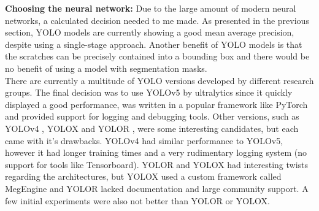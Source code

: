 \textbf{Choosing the neural network:}
Due to the large amount of modern neural networks, a calculated decision needed to me made. As presented in the previous section, YOLO models are currently showing a good mean average precision, despite using a single-stage approach. Another benefit of YOLO models is that the scratches can be precisely contained into a bounding box and there would be no benefit of using a model with segmentation masks. \\
There are currently a multitude of YOLO versions developed by different research groups. The final decision was to use YOLOv5 by ultralytics \cite{yolov5_git} since it quickly displayed a good performance, was written in a popular framework like PyTorch and provided support for logging and debugging tools. Other versions, such as YOLOv4 \cite{yolov4_paper}, YOLOX \cite{yolox_paper} and YOLOR \cite{yolor_paper}, were some interesting candidates, but each came with it's drawbacks. YOLOv4 had similar performance to YOLOv5, however it had longer training times and a very rudimentary logging system (no support for tools like Tensorboard). YOLOR and YOLOX had interesting twists regarding the architectures, but YOLOX used a custom framework called MegEngine \cite{megengine_git} and YOLOR lacked documentation and large community support. A few initial experiments were also not better than YOLOR or YOLOX. \\

